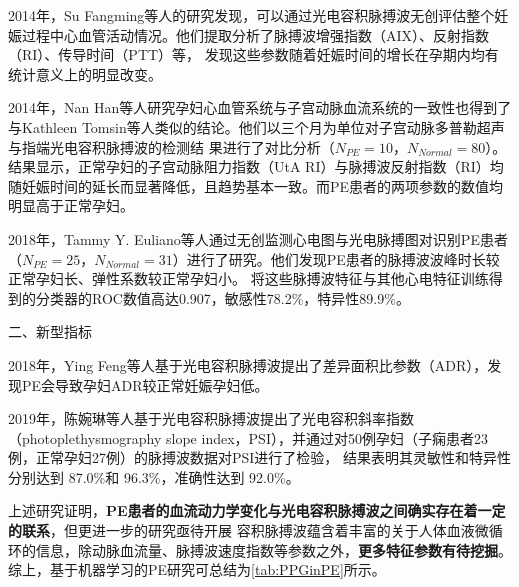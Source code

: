 2014年，Su Fangming等人\cite{Su2014}的研究发现，可以通过光电容积脉搏波无创评估整个妊娠过程中心血管活动情况。他们提取分析了脉搏波增强指数（AIX）、反射指数（RI）、传导时间（PTT）等，
发现这些参数随着妊娠时间的增长在孕期内均有统计意义上的明显改变。

2014年，Nan Han等人\cite{Han2014}研究孕妇心血管系统与子宫动脉血流系统的一致性也得到了与Kathleen Tomsin等人\cite{Tomsin2012}类似的结论。他们以三个月为单位对子宫动脉多普勒超声与指端光电容积脉搏波的检测结
果进行了对比分析（$N_{PE}=10$，$N_{Normal}=80$）。结果显示，正常孕妇的子宫动脉阻力指数（UtA RI）与脉搏波反射指数（RI）均随妊娠时间的延长而显著降低，且趋势基本一致。而PE患者的两项参数的数值均明显高于正常孕妇。

2018年，Tammy Y. Euliano等人\cite{Euliano2018}通过无创监测心电图与光电脉搏图对识别PE患者（$N_{PE}=25$，$N_{Normal}=31$）进行了研究。他们发现PE患者的脉搏波波峰时长较正常孕妇长、弹性系数较正常孕妇小。
将这些脉搏波特征与其他心电特征训练得到的分类器的ROC数值高达0.907，敏感性78.2\%，特异性89.9\%。

二、新型指标

2018年，Ying Feng等人\cite{Feng2018}基于光电容积脉搏波提出了差异面积比参数（ADR），发现PE会导致孕妇ADR较正常妊娠孕妇低。

2019年，陈婉琳等人\cite{Chen2019}基于光电容积脉搏波提出了光电容积斜率指数（photoplethysmography slope index，PSI），并通过对50例孕妇（子痫患者23例，正常孕妇27例）的脉搏波数据对PSI进行了检验，
结果表明其灵敏性和特异性分别达到 87.0\%和 96.3\%，准确性达到 92.0\%。

上述研究证明，\textbf{PE患者的血流动力学变化与光电容积脉搏波之间确实存在着一定的联系}，但更进一步的研究亟待开展
容积脉搏波蕴含着丰富的关于人体血液微循环的信息，除动脉血流量、脉搏波速度指数等参数之外，\textbf{更多特征参数有待挖掘}。
综上，基于机器学习的PE研究可总结为\autoref{tab:PPGinPE}所示。

